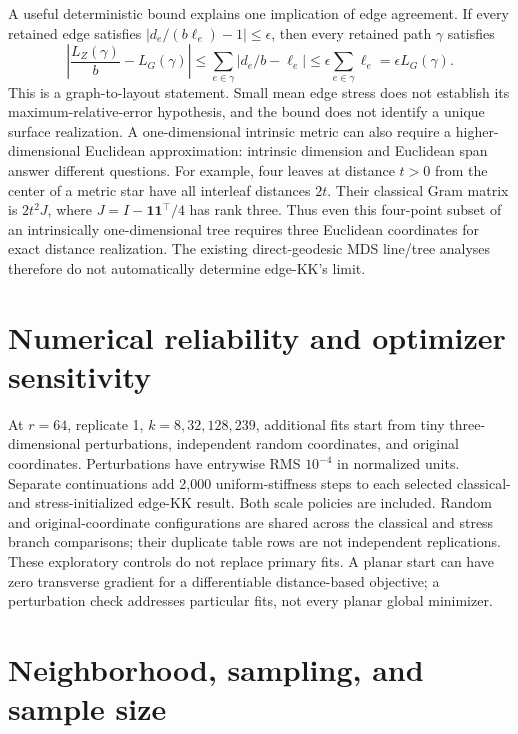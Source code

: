 \documentclass[11pt,letterpaper,landscape]{article}
\begin{document}
A useful deterministic bound explains one implication of edge agreement.
If every retained edge satisfies $|d_e/(b\ell_e)-1|\leq\epsilon$, then every
retained path $\gamma$ satisfies
\[
 \left|\frac{L_Z(\gamma)}b-L_G(\gamma)\right|
 \leq\sum_{e\in\gamma}|d_e/b-\ell_e|
 \leq\epsilon\sum_{e\in\gamma}\ell_e
 =\epsilon L_G(\gamma).
\]
This is a graph-to-layout statement. Small mean edge stress does not establish
its maximum-relative-error hypothesis, and the bound does not identify a unique
surface realization. A one-dimensional intrinsic metric can also require a
higher-dimensional Euclidean approximation: intrinsic dimension and Euclidean
span answer different questions. For example, four leaves at distance $t>0$
from the center of a metric star have all interleaf distances $2t$. Their
classical Gram matrix is $2t^2J$, where $J=I-\mathbf1\mathbf1^\top/4$ has rank
three. Thus even this four-point subset of an intrinsically one-dimensional
tree requires three Euclidean coordinates for exact distance realization. The existing direct-geodesic MDS line/tree
analyses therefore do not automatically determine edge-KK's limit.

\clearpage
\section*{Numerical reliability and optimizer sensitivity}


At $r=64$, replicate 1, $k=8,32,128,239$, additional fits start from tiny
three-dimensional perturbations, independent random coordinates, and original
coordinates. Perturbations have entrywise RMS $10^{-4}$ in normalized units.
Separate continuations add 2,000 uniform-stiffness steps to each selected
classical- and stress-initialized edge-KK result. Both scale policies are
included. Random and original-coordinate configurations are shared across the
classical and stress branch comparisons; their duplicate table rows are not
independent replications. These exploratory controls do not replace primary fits.
A planar start can have zero transverse gradient for a differentiable
distance-based objective; a perturbation check addresses particular fits,
not every planar global minimizer.



\clearpage
\section*{Neighborhood, sampling, and sample size}

\end{document}
